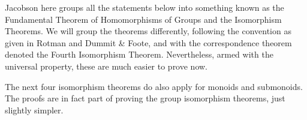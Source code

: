 \begin{remark}\label{rmk:iso-numbering}
    Jacobson here groups all the statements below into something
    known as the Fundamental Theorem of Homomorphisms of Groups
    and the Isomorphism Theorems.
    We will group the theorems differently,
    following the convention as given in Rotman and Dummit \& Foote,
    and with the correspondence theorem denoted the Fourth Isomorphism Theorem.
    Nevertheless, armed with the universal property,
    these are much easier to prove now.
\end{remark}
\begin{remark}
    The next four isomorphism theorems do also apply for monoids and submonoids.
    The proofs are in fact part of proving the group isomorphism theorems,
    just slightly simpler.
\end{remark}

